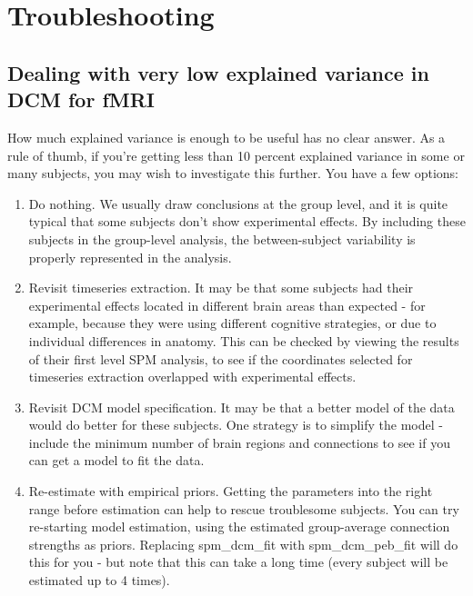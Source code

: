 \documentclass{article}
\begin{document}
\section{Troubleshooting} \label{troubleshooting}

\subsection{Dealing with very low explained variance in DCM for fMRI}

How much explained variance is enough to be useful has no clear answer. As a rule of thumb, if you're getting less than 10 percent explained variance in some or many subjects, you may wish to investigate this further. You have a few options:

\begin{enumerate}
\item Do nothing. We usually draw conclusions at the group level, and it is quite typical that some subjects don't show experimental effects. By including these subjects in the group-level analysis, the between-subject variability is properly represented in the analysis.
\item Revisit timeseries extraction. It may be that some subjects had their experimental effects located in different brain areas than expected - for example, because they were using different cognitive strategies, or due to individual differences in anatomy. This can be checked by viewing the results of their first level SPM analysis, to see if the coordinates  selected for timeseries extraction overlapped with experimental effects. 
\item Revisit DCM model specification. It may be that a better model of the data would do better for these subjects. One strategy is to simplify the model - include the minimum number of brain regions and connections to see if you can get a model to fit the data.
\item Re-estimate with empirical priors. Getting the parameters into the right range before estimation can help to rescue troublesome subjects. You can try re-starting model estimation, using the estimated group-average connection strengths as priors. Replacing spm\_dcm\_fit with spm\_dcm\_peb\_fit will do this for you - but note that this can take a long time (every subject will be estimated up to 4 times).

\end{enumerate}
\end{document}
